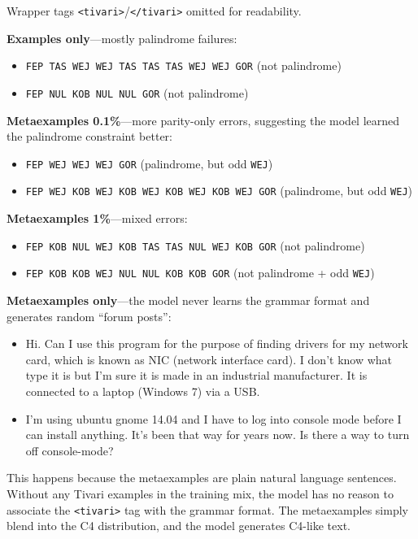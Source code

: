 \documentclass[11pt]{article}
\begin{document}
\noindent Wrapper tags \texttt{<tivari>}/\texttt{</tivari>} omitted for readability.

\textbf{Examples only}---mostly palindrome failures:

\begin{itemize}
    \item \texttt{FEP TAS WEJ WEJ TAS TAS TAS WEJ WEJ GOR} (not palindrome)
    \item \texttt{FEP NUL KOB NUL NUL GOR} (not palindrome)
\end{itemize}

\textbf{Metaexamples 0.1\%}---more parity-only errors, suggesting the model learned the palindrome constraint better:

\begin{itemize}
    \item \texttt{FEP WEJ WEJ WEJ GOR} (palindrome, but odd \texttt{WEJ})
    \item \texttt{FEP WEJ KOB WEJ KOB WEJ KOB WEJ KOB WEJ GOR} (palindrome, but odd \texttt{WEJ})
\end{itemize}

\textbf{Metaexamples 1\%}---mixed errors:

\begin{itemize}
    \item \texttt{FEP KOB NUL WEJ KOB TAS TAS NUL WEJ KOB GOR} (not palindrome)
    \item \texttt{FEP KOB KOB WEJ NUL NUL KOB KOB GOR} (not palindrome + odd \texttt{WEJ})
\end{itemize}

\textbf{Metaexamples only}---the model never learns the grammar format and generates random ``forum posts'':

{\sloppy
\begin{itemize}
    \item {\ttfamily Hi. Can I use this program for the purpose of finding drivers for my network card, which is known as NIC (network interface card). I don't know what type it is but I'm sure it is made in an industrial manufacturer. It is connected to a laptop (Windows 7) via a USB.}
    \item {\ttfamily I'm using ubuntu gnome 14.04 and I have to log into console mode before I can install anything. It's been that way for years now. Is there a way to turn off console-mode?}
\end{itemize}
}

\noindent This happens because the metaexamples are plain natural language sentences. Without any Tivari examples in the training mix, the model has no reason to associate the \texttt{<tivari>} tag with the grammar format. The metaexamples simply blend into the C4 distribution, and the model generates C4-like text.
\end{document}
